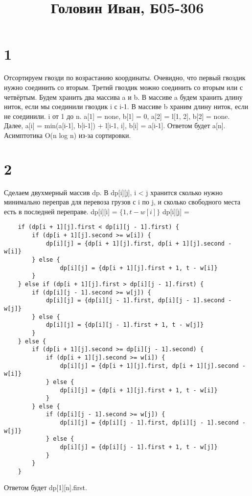 \documentclass{extarticle}
\title{Головин Иван, Б05-306}
\begin{document}
\maketitle

\section*{1}
Отсортируем гвозди по возрастанию координаты.
\newline
Очевидно, что первый гвоздик нужно соединить со вторым.
\newline
Третий гвоздик можно соединить со вторым или с четвёртым. Будем хранить два массива a и b. В массиве a будем хранить длину ниток, если мы соединили гвоздик i с i-1. В массиве b храним длину ниток, если не соединили. i от 1 до n. a[1] = none, b[1] = 0, a[2] = l[1, 2], b[2] = none. Далее, a[i] = min(a[i-1], b[i-1]) + l[i-1, i], b[i] = a[i-1]. Ответом будет a[n].
\newline
Асимптотика O(n log n) из-за сортировки.

\section*{2}
Сделаем двухмерный массив dp.
\newline
В dp[i][j], i < j хранится сколько нужно минимально переправ для перевоза грузов с i по j, и сколько свободного места есть в последней переправе.
\newline
dp[i][i] = $\{1, t - w[i]\}$
\newline
dp[i][j] =
\begin{lstlisting}
    if (dp[i + 1][j].first < dp[i][j - 1].first) {
        if (dp[i + 1][j].second >= w[i]) {
            dp[i][j] = {dp[i + 1][j].first, dp[i + 1][j].second - w[i]}
        } else {
                dp[i][j] = {dp[i + 1][j].first + 1, t - w[i]}
        }
    } else if (dp[i + 1][j].first > dp[i][j - 1].first) {
        if (dp[i][j - 1].second >= w[j]) {
            dp[i][j] = {dp[i][j - 1].first, dp[i][j - 1].second - w[j]}
        } else {
            dp[i][j] = {dp[i][j - 1].first + 1, t - w[j]}
        }
    } else {
        if (dp[i + 1][j].second >= dp[i][j - 1].second) {
            if (dp[i + 1][j].second >= w[i]) {
                dp[i][j] = {dp[i + 1][j].first, dp[i + 1][j].second - w[i]}
            } else {
                dp[i][j] = {dp[i + 1][j].first + 1, t - w[i]}
            }
        } else {
            if (dp[i][j - 1].second >= w[j]) {
                dp[i][j] = {dp[i][j - 1].first, dp[i][j - 1].second - w[j]}
            } else {
                dp[i][j] = {dp[i][j - 1].first + 1, t - w[j]}
            }
        }
    }
\end{lstlisting}
Ответом будет dp[1][n].first.
\end{document}
